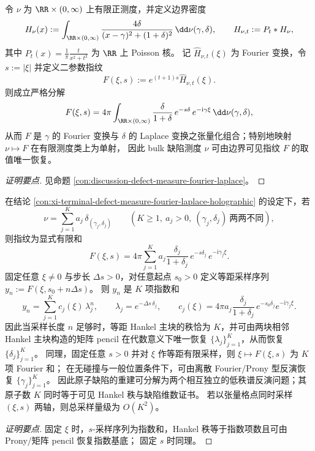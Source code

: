 \begin{conclusion}\label{con:xi-terminal-defect-measure-fourier-laplace-holographic}
令 \(\nu\) 为 \(\RR\times(0,\infty)\) 上有限正测度，并定义边界密度
\[
H_\nu(x):=\int_{\RR\times(0,\infty)}\frac{4\delta}{(x-\gamma)^2+(1+\delta)^2}\,\dd\nu(\gamma,\delta),
\qquad
H_{\nu,t}:=P_t*H_\nu,
\]
其中 \(P_t(x)=\frac{1}{\pi}\frac{t}{x^2+t^2}\) 为 \(\RR\) 上 Poisson 核。
记 \(\widehat{H}_{\nu,t}(\xi)\) 为 Fourier 变换，令 \(s:=|\xi|\) 并定义二参数指纹
\[
F(\xi,s):=e^{(t+1)s}\widehat{H}_{\nu,t}(\xi).
\]
则成立严格分解
\[
F(\xi,s)=4\pi\int_{\RR\times(0,\infty)}\frac{\delta}{1+\delta}\,e^{-s\delta}\,e^{-\mathrm{i}\gamma\xi}\,\dd\nu(\gamma,\delta),
\]
从而 \(F\) 是 \(\gamma\) 的 Fourier 变换与 \(\delta\) 的 Laplace 变换之张量化组合；特别地映射 \(\nu\mapsto F\) 在有限测度类上为单射，
因此 bulk 缺陷测度 \(\nu\) 可由边界可见指纹 \(F\) 的取值唯一恢复。
\end{conclusion}
\begin{proof}[证明要点]
见命题 \ref{con:discussion-defect-measure-fourier-laplace}。
\end{proof}

\begin{conclusion}\label{con:xi-terminal-atomic-defect-hankel-prony}
在结论 \ref{con:xi-terminal-defect-measure-fourier-laplace-holographic} 的设定下，若
\[
\nu=\sum_{j=1}^{K}a_j\,\delta_{(\gamma_j,\delta_j)}
\qquad(K\ge 1,\ a_j>0,\ (\gamma_j,\delta_j)\ \text{两两不同}),
\]
则指纹为显式有限和
\[
F(\xi,s)=4\pi\sum_{j=1}^{K}a_j\frac{\delta_j}{1+\delta_j}\,e^{-s\delta_j}\,e^{-\mathrm{i}\gamma_j\xi}.
\]
固定任意 \(\xi\neq 0\) 与步长 \(\Delta s>0\)，对任意起点 \(s_0>0\) 定义等距采样序列
\(
y_n:=F(\xi,s_0+n\Delta s)
\)。
则 \(y_n\) 是 \(K\) 项指数和
\[
y_n=\sum_{j=1}^{K}c_j(\xi)\,\lambda_j^{n},
\qquad
\lambda_j=e^{-\Delta s\,\delta_j},
\qquad
c_j(\xi)=4\pi a_j\frac{\delta_j}{1+\delta_j}\,e^{-s_0\delta_j}e^{-\mathrm{i}\gamma_j\xi}.
\]
因此当采样长度 \(n\) 足够时，等距 Hankel 主块的秩恰为 \(K\)，并可由两块相邻 Hankel 主块构造的矩阵 pencil 在代数意义下唯一恢复 \(\{\lambda_j\}_{j=1}^{K}\)，从而恢复 \(\{\delta_j\}_{j=1}^{K}\)。
同理，固定任意 \(s>0\) 并对 \(\xi\) 作等距有限采样，则 \(\xi\mapsto F(\xi,s)\) 为 \(K\) 项 Fourier 和；
在无碰撞与一般位置条件下，可由离散 Fourier/Prony 型反演恢复 \(\{\gamma_j\}_{j=1}^{K}\)。
因此原子缺陷的重建可分解为两个相互独立的低秩谱反演问题；其原子数 \(K\) 同时等于可见 Hankel 秩与缺陷维数证书。
若以张量格点同时采样 \((\xi,s)\) 两轴，则总采样量级为 \(O(K^2)\)。
\end{conclusion}
\begin{proof}[证明要点]
固定 \(\xi\) 时，\(s\)-采样序列为指数和，Hankel 秩等于指数项数且可由 Prony/矩阵 pencil 恢复指数基底；
固定 \(s\) 时同理。
\end{proof}

